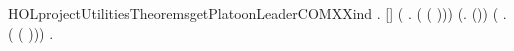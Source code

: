 \newcommand{\HOLprojectUtilitiesTheoremsgetPlatoonLeaderCOMXXdef}{\UseVerbatim{HOLprojectUtilitiesTheoremsgetPlatoonLeaderCOMXXdef}}
\begin{SaveVerbatim}{HOLprojectUtilitiesTheoremsgetPlatoonLeaderCOMXXind}
\HOLTokenTurnstile{} \HOLSymConst{\HOLTokenForall{}}.
      [] \HOLSymConst{\HOLTokenConj{}} (\HOLSymConst{\HOLTokenForall{}} .  ( ( )\HOLSymConst{::})) \HOLSymConst{\HOLTokenConj{}}
     (\HOLSymConst{\HOLTokenForall{}}.   \HOLSymConst{\HOLTokenImp{}}  (\HOLSymConst{::})) \HOLSymConst{\HOLTokenConj{}}
     (\HOLSymConst{\HOLTokenForall{}} .   \HOLSymConst{\HOLTokenImp{}}  ( ( )\HOLSymConst{::})) \HOLSymConst{\HOLTokenImp{}}
     \HOLSymConst{\HOLTokenForall{}}.  
\end{SaveVerbatim}
\newcommand{\HOLprojectUtilitiesTheoremsgetPlatoonLeaderCOMXXind}{\UseVerbatim{HOLprojectUtilitiesTheoremsgetPlatoonLeaderCOMXXind}}
